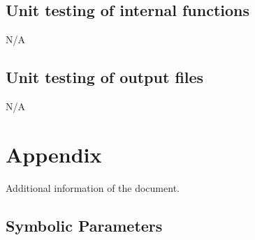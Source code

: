 \documentclass[12pt, titlepage]{article}
\begin{document}
\subsection{Unit testing of internal functions}
N/A
\subsection{Unit testing of output files}		
N/A

\newpage

\section{Appendix}
Additional information of the document.

\subsection{Symbolic Parameters}
\end{document}
